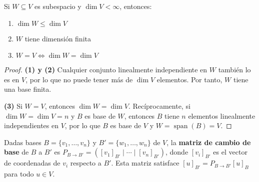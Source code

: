 \begin{theorem}
Si $W \subseteq V$ es subespacio y $\dim V < \infty$, entonces:
\begin{enumerate}
\item $\dim W \leq \dim V$
\item $W$ tiene dimensión finita
\item $W = V \iff \dim W = \dim V$
\end{enumerate}
\begin{proof}
\textbf{(1) y (2)} Cualquier conjunto linealmente independiente en $W$ también lo es en $V$, por lo que no puede tener más de $\dim V$ elementos. Por tanto, $W$ tiene una base finita.

\textbf{(3)} Si $W = V$, entonces $\dim W = \dim V$. Recíprocamente, si $\dim W = \dim V = n$ y $B$ es base de $W$, entonces $B$ tiene $n$ elementos linealmente independientes en $V$, por lo que $B$ es base de $V$ y $W = \operatorname{span}(B) = V$.
\end{proof}
\end{theorem}

\begin{definition}
Dadas bases $B = \{v_1,\dots,v_n\}$ y $B' = \{w_1,\dots,w_n\}$ de $V$, la \textbf{matriz de cambio de base} de $B$ a $B'$ es $P_{B\to B'} = ([v_1]_{B'} \mid \cdots \mid [v_n]_{B'})$, donde $[v_i]_{B'}$ es el vector de coordenadas de $v_i$ respecto a $B'$. Esta matriz satisface $[u]_{B'} = P_{B\to B'}[u]_B$ para todo $u \in V$.
\end{definition}


